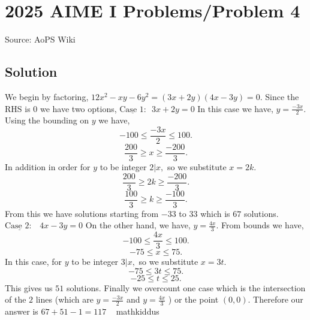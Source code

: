 \documentclass[12pt]{article}
\begin{document}
\section*{{2025 AIME I Problems/Problem 4}}
Source: AoPS Wiki

\subsection*{Solution}
We begin by factoring, $12x^2-xy-6y^2=(3x+2y)(4x-3y)=0.$ Since the RHS is $0$ we have two options, $\underline{\text{Case 1:}}\text{ } 3x+2y = 0$ In this case we have, $y=\frac{-3x}{2}.$ Using the bounding on $y$ we have, \[-100\le\frac{-3x}{2}\le 100.\] \[\frac{200}{3}\ge x \ge \frac{-200}{3}.\] In addition in order for $y$ to be integer $2 | x,$ so we substitute $x=2k.$ \[\frac{200}{3}\ge 2k \ge \frac{-200}{3}.\] \[\frac{100}{3}\ge k \ge \frac{-100}{3}.\] From this we have solutions starting from $-33$ to $33$ which is $67$ solutions. $\underline{\text{Case 2: }}\text{ } 4x-3y = 0$ On the other hand, we have, $y=\frac{4x}{3}.$ From bounds we have, \[-100\le\frac{4x}{3}\le 100.\] \[-75 \le x \le 75.\] In this case, for $y$ to be integer $3 | x,$ so we substitute $x=3t.$ \[-75 \le 3t \le 75.\] \[-25 \le t \le 25.\] This gives us $51$ solutions. Finally we overcount one case which is the intersection of the $2$ lines (which are $y=\frac{-3x}{2}$ and $y=\frac{4x}{3}$ ) or the point $(0,0).$ Therefore our answer is $67+51-1=\boxed{117}$ ~ mathkiddus
\end{document}
